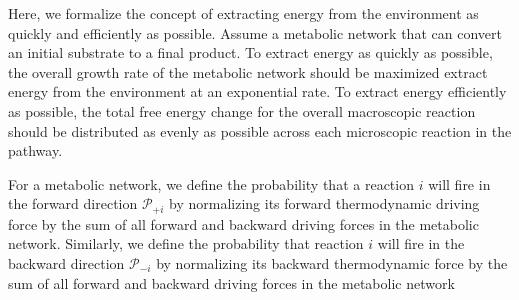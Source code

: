 Here, we formalize the concept of extracting energy from the environment as quickly and efficiently as possible. Assume a metabolic network that can convert an initial substrate to a final product. To extract energy as quickly as possible, the overall growth rate of the metabolic network should be maximized extract energy from the environment at an exponential rate.   To extract energy efficiently as possible, the total free energy change for the overall macroscopic reaction should be distributed as evenly as possible across each microscopic reaction in the pathway.


For a metabolic network, we define the probability that a reaction $i$ will fire in the forward  direction ${\mathcal P_{+i}}$ by normalizing its forward thermodynamic driving force by the sum of all forward and backward driving forces in the metabolic network. Similarly, we define the probability that reaction $i$ will fire in the backward direction $\mathcal P_{-i}$ by normalizing its backward thermodynamic force by  the sum of all forward and backward driving forces in the metabolic network